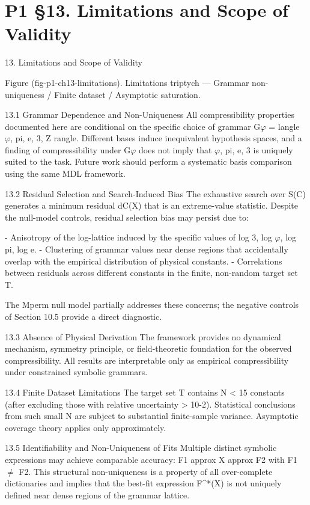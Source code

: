 
\section{P1 §13. Limitations and Scope of Validity}

13. Limitations and Scope of Validity

  Figure (fig-p1-ch13-limitations). Limitations triptych --- Grammar non-uniqueness / Finite dataset
                                       / Asymptotic saturation.

  13.1 Grammar Dependence and Non-Uniqueness
  All compressibility properties documented here are conditional on the specific choice of
  grammar G$\varphi$ = langle $\varphi$, pi, e, 3, Z rangle. Different bases induce inequivalent
  hypothesis spaces, and a finding of compressibility under G$\varphi$ does not imply that {$\varphi$, pi,
  e, 3} is uniquely suited to the task. Future work should perform a systematic basis
  comparison using the same MDL framework.

  13.2 Residual Selection and Search-Induced Bias
  The exhaustive search over S(C) generates a minimum residual dC(X) that is an
  extreme-value statistic. Despite the null-model controls, residual selection bias may
  persist due to:

  - Anisotropy of the log-lattice induced by the specific values of log 3, log $\varphi$, log pi, log e.
  - Clustering of grammar values near dense regions that accidentally overlap with the
  empirical distribution of physical constants.
  - Correlations between residuals across different constants in the finite, non-random
  target set T.

  The Mperm null model partially addresses these concerns; the negative controls of
  Section 10.5 provide a direct diagnostic.

  13.3 Absence of Physical Derivation
  The framework provides no dynamical mechanism, symmetry principle, or
  field-theoretic foundation for the observed compressibility. All results are interpretable
  only as empirical compressibility under constrained symbolic grammars.

  13.4 Finite Dataset Limitations
  The target set T contains N < 15 constants (after excluding those with relative
  uncertainty > 10-2). Statistical conclusions from such small N are subject to substantial
  finite-sample variance. Asymptotic coverage theory applies only approximately.

  13.5 Identifiability and Non-Uniqueness of Fits
  Multiple distinct symbolic expressions may achieve comparable accuracy: F1 approx X
  approx F2 with F1 $\neq$ F2. This structural non-uniqueness is a property of all
  over-complete dictionaries and implies that the best-fit expression F\textasciicircum{}*(X) is not
  uniquely defined near dense regions of the grammar lattice.

